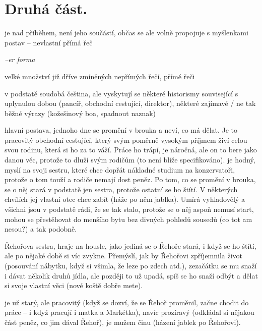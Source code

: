 \documentclass{article}
\begin{document}
\section{Druhá část.}
\begin{description}
    \setlength\itemsep{0.15em}
    \item[vypravěč:] je nad příběhem, není jeho součástí, občas se ale volně propojuje s myšlenkami postav -- nevlastní přímá řeč
    \item[vyprávěcí způsoby:] \textit{--er forma}
    \item[typy promluv:] velké množství již dříve zmíněných nepřímých řečí, přímé řeči
    \item[jazyková stránka:] v podstatě soudobá čeština, ale vyskytují se některé historismy související s uplynulou dobou (pancíř, obchodní cestující, direktor), některé zajímavé / ne tak běžné výrazy (kožešinový boa, spadnout naznak)
    \item[postavy:]
        \begin{description}
            \setlength\itemsep{0.15em}
            \item[Řehoř Samsa,] hlavní postava, jednoho dne se promění v brouka a neví, co má dělat. Je to pracovitý obchodní cestující, který svým poměrně vysokým příjmem živí celou svou rodinu, která si ho za to váží. Práce ho trápí, je náročná, ale on to bere jako danou věc, protože to dluží svým rodičům (to není blíže specifikováno). je hodný, myslí na svoji sestru, které chce dopřát nákladné studium na konzervatoři, protože o tom touží a rodiče nemají dost peněz. Po tom, co se promění v brouka, se o něj stará v podstatě jen sestra, protože ostatní se ho štítí. V některých chvílích jej vlastní otec chce zabít (háže po něm jablka). Umírá vyhladovělý a všichni jsou v podstatě rádi, že se tak stalo, protože se o něj aspoň nemusí start, mohou se přestěhovat do menšího bytu bez divných pohledů sousedů (co tot am nesou?) a tak podobně.
            \item[Markéta,] Řehořova sestra, hraje na housle, jako jediná se o Řehoře stará, i když se ho štítí, ale po nějaké době si víc zvykne. Přemýslí, jak by Řehořovi zpříjemnila život (posouvání nábytku, když si všimla, že leze po zdech atd.), zezačátku se mu snaží i dávat několik druhů jídla, ale později to už upadá, spíš se ho snaží odbýt a dělat si svoje vlastní věci (nové koště dobře mete).
            \item[Řehořův otec] je už starý, ale pracovitý (když se dozví, že se Řehoř proměnil, začne chodit do práce -- i když pracují i matka a Markétka), navíc prozíravý (odkládal si nějakou část peněz, co jim dával Řehoř), je mužem činu (házení jablek po Řehořovi).

\end{description}
\end{description}
\end{document}
